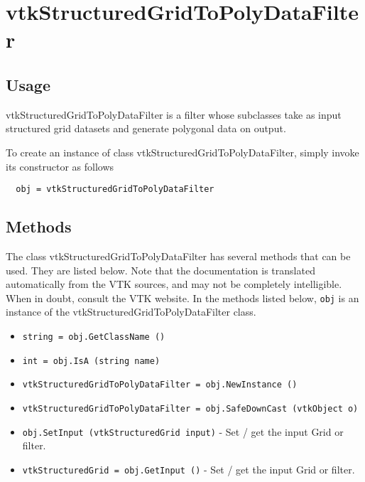 \section{vtkStructuredGridToPolyDataFilter}

\subsection{Usage}

 vtkStructuredGridToPolyDataFilter is a filter whose subclasses take as input
 structured grid datasets and generate polygonal data on output. 

To create an instance of class vtkStructuredGridToPolyDataFilter, simply
invoke its constructor as follows
\begin{verbatim}
  obj = vtkStructuredGridToPolyDataFilter
\end{verbatim}
\subsection{Methods}

The class vtkStructuredGridToPolyDataFilter has several methods that can be used.
  They are listed below.
Note that the documentation is translated automatically from the VTK sources,
and may not be completely intelligible.  When in doubt, consult the VTK website.
In the methods listed below, \verb|obj| is an instance of the vtkStructuredGridToPolyDataFilter class.
\begin{itemize}
\item  \verb|string = obj.GetClassName ()|

\item  \verb|int = obj.IsA (string name)|

\item  \verb|vtkStructuredGridToPolyDataFilter = obj.NewInstance ()|

\item  \verb|vtkStructuredGridToPolyDataFilter = obj.SafeDownCast (vtkObject o)|

\item  \verb|obj.SetInput (vtkStructuredGrid input)| -  Set / get the input Grid or filter.

\item  \verb|vtkStructuredGrid = obj.GetInput ()| -  Set / get the input Grid or filter.

\end{itemize}
